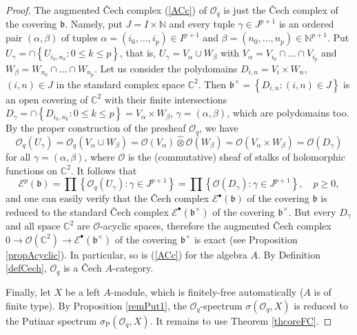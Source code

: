 \documentclass[12pt]{amsart}%
\theoremstyle{plain}
\numberwithin{equation}{section}
\numberwithin{equation}{section}
\numberwithin{theorem}{section}
\numberwithin{lemma}{section}
\numberwithin{remark}{section}
\numberwithin{example}{section}
\numberwithin{proposition}{section}
\numberwithin{definition}{section}
\numberwithin{corollary}{section}
\begin{document}
\begin{proof}
The augmented \v{C}ech complex (\ref{ACc}) of $\mathcal{O}_{q}$ is just the
\v{C}ech complex of the covering $\mathfrak{b}$. Namely, put $J=I\times
\mathbb{N}$ and every tuple $\gamma\in J^{p+1}$ is an ordered pair $\left(
\alpha,\beta\right)  $ of tuples $\alpha=\left(  i_{0},\ldots,i_{p}\right)
\in I^{p+1}$ and $\beta=\left(  n_{0},\ldots,n_{p}\right)  \in\mathbb{N}%
^{p+1}$. Put $U_{\gamma}=\cap\left\{  U_{i_{k},n_{k}}:0\leq k\leq p\right\}
$, that is, $U_{\gamma}=V_{\alpha}\cup W_{\beta}$ with $V_{\alpha}=V_{i_{0}%
}\cap\ldots\cap V_{i_{p}}$ and $W_{\beta}=W_{n_{0}}\cap\ldots\cap W_{n_{p}}$.
Let us consider the polydomains $D_{i,n}=V_{i}\times W_{n}$, $\left(
i,n\right)  \in J$ in the standard complex space $\mathbb{C}^{2}$. Then
$\mathfrak{b}^{\times}=\left\{  D_{i,n}:\left(  i,n\right)  \in J\right\}  $
is an open covering of $\mathbb{C}^{2}$ with their finite intersections
$D_{\gamma}=\cap\left\{  D_{i_{k},n_{k}}:0\leq k\leq p\right\}  =V_{\alpha
}\times W_{\beta}$, $\gamma=\left(  \alpha,\beta\right)  $, which are
polydomains too. By the proper construction of the presheaf $\mathcal{O}_{q}$,
we have%
\[
\mathcal{O}_{q}\left(  U_{\gamma}\right)  =\mathcal{O}_{q}\left(  V_{\alpha
}\cup W_{\beta}\right)  =\mathcal{O}\left(  V_{\alpha}\right)
\widehat{\otimes}\mathcal{O}\left(  W_{\beta}\right)  =\mathcal{O}\left(
V_{\alpha}\times W_{\beta}\right)  =\mathcal{O}\left(  D_{\gamma}\right)
\]
for all $\gamma=\left(  \alpha,\beta\right)  $, where $\mathcal{O}$ is the
(commutative) sheaf of stalks of holomorphic functions on $\mathbb{C}^{2}$. It
follows that
\[
\mathcal{E}^{p}\left(  \mathfrak{b}\right)  =\prod\left\{  \mathcal{O}%
_{q}\left(  U_{\gamma}\right)  :\gamma\in J^{p+1}\right\}  =\prod\left\{
\mathcal{O}\left(  D_{\gamma}\right)  :\gamma\in J^{p+1}\right\}  ,\quad
p\geq0,
\]
and one can easily verify that the \v{C}ech complex $\mathcal{E}^{\bullet
}\left(  \mathfrak{b}\right)  $ of the covering $\mathfrak{b}$ is reduced to
the standard \v{C}ech complex $\mathcal{E}^{\bullet}\left(  \mathfrak{b}%
^{\times}\right)  $ of the covering $\mathfrak{b}^{\times}$. But every
$D_{\gamma}$ and all space $\mathbb{C}^{2}$ are $\mathcal{O}$-acyclic spaces,
therefore the augmented \v{C}ech complex $0\rightarrow\mathcal{O}\left(
\mathbb{C}^{2}\right)  \longrightarrow\mathcal{E}^{\bullet}\left(
\mathfrak{b}^{\times}\right)  $ of the covering $\mathfrak{b}^{\times}$ is
exact (see Proposition \ref{propAcyclic}). In particular, so is (\ref{ACc})
for the algebra $A$. By Definition \ref{defCech}, $\mathcal{O}_{q}$ is a
\v{C}ech $A$-category.

Finally, let $X$ be a left $A$-module, which is finitely-free automatically
($A$ is of finite type). By Proposition \ref{remPut1}, the $\mathcal{O}_{q}%
$-spectrum $\sigma\left(  \mathcal{O}_{q},X\right)  $ is reduced to the
Putinar spectrum $\sigma_{\operatorname{P}}\left(  \mathcal{O}_{q},X\right)
$. It remains to use Theorem \ref{thcoreFC}.
\end{proof}
\end{document}
